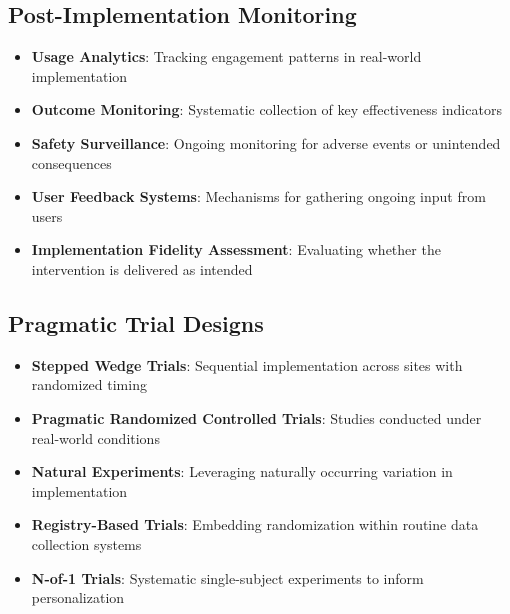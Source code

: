 \subsection{Post-Implementation Monitoring}
\begin{itemize}
    \item \textbf{Usage Analytics}: Tracking engagement patterns in real-world implementation
    
    \item \textbf{Outcome Monitoring}: Systematic collection of key effectiveness indicators
    
    \item \textbf{Safety Surveillance}: Ongoing monitoring for adverse events or unintended consequences
    
    \item \textbf{User Feedback Systems}: Mechanisms for gathering ongoing input from users
    
    \item \textbf{Implementation Fidelity Assessment}: Evaluating whether the intervention is delivered as intended
\end{itemize}

\subsection{Pragmatic Trial Designs}
\begin{itemize}
    \item \textbf{Stepped Wedge Trials}: Sequential implementation across sites with randomized timing
    
    \item \textbf{Pragmatic Randomized Controlled Trials}: Studies conducted under real-world conditions
    
    \item \textbf{Natural Experiments}: Leveraging naturally occurring variation in implementation
    
    \item \textbf{Registry-Based Trials}: Embedding randomization within routine data collection systems
    
    \item \textbf{N-of-1 Trials}: Systematic single-subject experiments to inform personalization
\end{itemize}

